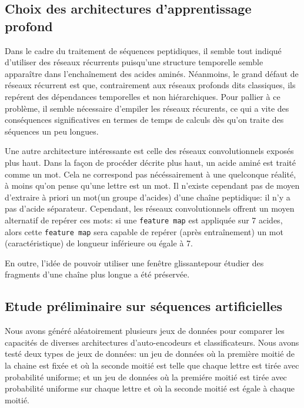 \documentclass[a4paper, 11pt, onecolumn]{article}
\begin{document}
\subsection{Choix des architectures d'apprentissage profond}

Dans le cadre du traitement de séquences peptidiques, il semble tout indiqué
d'utiliser des réseaux récurrents puisqu'une structure temporelle semble
apparaître dans l'enchaînement des acides aminés. Néanmoins, le grand défaut de
réseaux récurrent est que, contrairement aux réseaux profonds dits \og
classiques\fg, ils repérent des dépendances temporelles et non hiérarchiques.
Pour pallier à ce problème, il semble nécessaire d'empiler les réseaux
récurents, ce qui a vite des conséquences significatives en termes de temps de
calculs dès qu'on traite des séquences un peu longues.

Une autre architecture intéressante est celle des réseaux convolutionnels
exposés plus haut. Dans la façon de procéder décrite plus haut, un acide aminé
est traité comme un \og mot\fg. Cela ne correspond pas nécéssairement à une
quelconque réalité, à moins qu'on pense qu'une lettre est un mot. Il n'existe
cependant pas de moyen d'extraire à priori un \og mot\fg (un groupe d'acides)
d'une chaîne peptidique: il n'y a pas d'acide \og séparateur\fg. Cependant, les
réseaux convolutionnels offrent un moyen alternatif de repérer ces mots: si une
\texttt{feature map} est appliquée sur 7 acides, alors cette \texttt{feature
  map} sera capable de repérer (après entraînement) un mot (caractéristique) de
longueur inférieure ou égale à 7.

En outre, l'idée de pouvoir utiliser une \og fenêtre glissante\fg pour étudier
des fragments d'une chaîne plus longue a été préservée.

\subsection{Etude préliminaire sur séquences artificielles}

Nous avons généré aléatoirement plusieurs jeux de données pour comparer les
capacités de diverses architectures d'auto-encodeurs et classificateurs. Nous
avons testé deux types de jeux de données: un jeu de données où la première
moitié de la chaine est fixée et où la seconde moitié est telle que chaque
lettre est tirée avec probabilité uniforme; et un jeu de données où la premiére
moitié est tirée avec probabilité uniforme sur chaque lettre et où la seconde
moitié est égale à chaque moitié.
\end{document}
